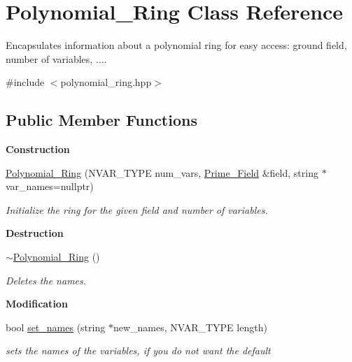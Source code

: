 \hypertarget{class_polynomial___ring}{}\section{Polynomial\+\_\+\+Ring Class Reference}
\label{class_polynomial___ring}


Encapsulates information about a polynomial ring for easy access\+: ground field, number of variables, {$\dots$}.  




{\ttfamily \#include $<$polynomial\+\_\+ring.\+hpp$>$}

\subsection*{Public Member Functions}
\begin{Indent}\textbf{ Construction}\par
\begin{DoxyCompactItemize}
\item 
\hyperlink{class_polynomial___ring_af62688669a31cb720bb1e90a724daa4f}{Polynomial\+\_\+\+Ring} (N\+V\+A\+R\+\_\+\+T\+Y\+PE num\+\_\+vars, \hyperlink{class_prime___field}{Prime\+\_\+\+Field} \&field, string $\ast$var\+\_\+names=nullptr)
\begin{DoxyCompactList}\small\item\em Initialize the ring for the given field and number of variables. \end{DoxyCompactList}\end{DoxyCompactItemize}
\end{Indent}
\begin{Indent}\textbf{ Destruction}\par
\begin{DoxyCompactItemize}
\item 
\mbox{\label{class_polynomial___ring_ac4952692f32f57ccd3a7e68e20cb3662}} 
\hyperlink{class_polynomial___ring_ac4952692f32f57ccd3a7e68e20cb3662}{$\sim$\+Polynomial\+\_\+\+Ring} ()
\begin{DoxyCompactList}\small\item\em Deletes the names. \end{DoxyCompactList}\end{DoxyCompactItemize}
\end{Indent}
\begin{Indent}\textbf{ Modification}\par
\begin{DoxyCompactItemize}
\item 
bool \hyperlink{class_polynomial___ring_ae59dcd21a16ffccc7b32e3c2f898b6f3}{set\+\_\+names} (string $\ast$new\+\_\+names, N\+V\+A\+R\+\_\+\+T\+Y\+PE length)
\begin{DoxyCompactList}\small\item\em sets the names of the variables, if you do not want the default \end{DoxyCompactList}\end{DoxyCompactItemize}
\end{Indent}

